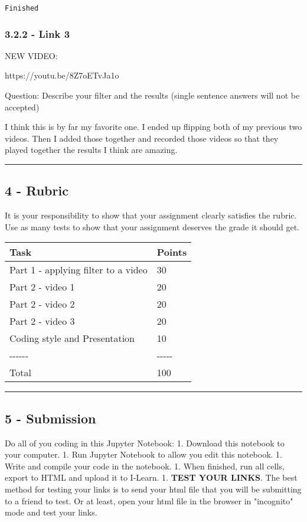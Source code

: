 \documentclass[11pt]{article}
\begin{document}
    \begin{Verbatim}[commandchars=\\\{\}]
Finished

    \end{Verbatim}

    \subsubsection{3.2.2 - Link 3}\label{link-3}

    NEW VIDEO:

https://youtu.be/8Z7oETvJa1o

Question: Describe your filter and the results (single sentence answers
will not be accepted)

I think this is by far my favorite one. I ended up flipping both of my
previous two videos. Then I added those together and recorded those
videos so that they played together the results I think are amazing.

    \begin{center}\rule{0.5\linewidth}{\linethickness}\end{center}

\subsection{4 - Rubric}\label{rubric}

It is your responsibility to show that your assignment clearly satisfies
the rubric. Use as many tests to show that your assignment deserves the
grade it should get.

\begin{longtable}[]{@{}ll@{}}
\toprule
Task & Points\tabularnewline
\midrule
\endhead
Part 1 - applying filter to a video & 30\tabularnewline
Part 2 - video 1 & 20\tabularnewline
Part 2 - video 2 & 20\tabularnewline
Part 2 - video 3 & 20\tabularnewline
Coding style and Presentation & 10\tabularnewline
-\/-\/-\/-\/-\/- & -\/-\/-\/-\/-\tabularnewline
Total & 100\tabularnewline
\bottomrule
\end{longtable}

    \begin{center}\rule{0.5\linewidth}{\linethickness}\end{center}

\subsection{5 - Submission}\label{submission}

Do all of you coding in this Jupyter Notebook: 1. Download this notebook
to your computer. 1. Run Jupyter Notebook to allow you edit this
notebook. 1. Write and compile your code in the notebook. 1. When
finished, run all cells, export to HTML and upload it to I-Learn. 1.
\textbf{TEST YOUR LINKS}. The best method for testing your links is to
send your html file that you will be submitting to a friend to test. Or
at least, open your html file in the browser in "incognito" mode and
test your links.


    
    
    
    
\end{document}
